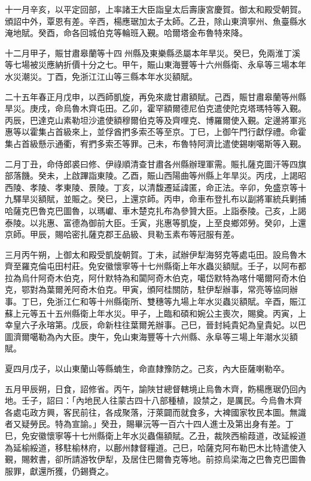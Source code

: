 \begin{pinyinscope}
十一月辛亥，以平定回部，上率諸王大臣詣皇太后壽康宮慶賀。御太和殿受朝賀。頒詔中外，覃恩有差。辛西，楊應琚加太子太師。乙丑，除山東濟寧州、魚臺縣水淹地賦。癸酉，命各回城伯克等輪班入覲。哈爾塔金布魯特來降。

十二月甲子，賑甘肅皋蘭等十四州縣及東樂縣丞屬本年旱災。癸巳，免兩淮丁溪等七場被災應納折價十分之七。甲午，賑山東海豐等十六州縣衛、永阜等三場本年水災潮災。丁酉，免浙江江山等三縣本年水災額賦。

二十五年春正月戊申，以西師凱旋，再免來歲甘肅額賦。己酉，賑甘肅皋蘭等州縣旱災。庚戌，命烏魯木齊屯田。乙卯，霍罕額爾德尼伯克遣使陀克塔瑪特等入覲。丙辰，巴達克山素勒坦沙遣使額穆爾伯克等及齊哩克、博羅爾使入覲。定邊將軍兆惠等以霍集占首級來上，並俘酋捫多索丕等至京。丁巳，上御午門行獻俘禮。命霍集占首級懸示通衢，宥捫多索丕等罪。己未，布魯特阿濟比遣使錫喇噶斯等入覲。

二月丁丑，命侍郎裘曰修、伊祿順清查甘肅各州縣辦理軍需。賑扎薩克圖汗等四旗部落饑。癸未，上啟蹕詣東陵。乙酉，賑山西陽曲等州縣上年旱災。丙戌，上謁昭西陵、孝陵、孝東陵、景陵。丁亥，以清馥遷延諱匿，命正法。辛卯，免盛京等十九驛旱災額賦，並賑之。癸巳，上還京師。丙申，命車布登扎布以副將軍統兵剿捕哈薩克巴魯克巴圖魯，以瑪巘、車木楚克扎布為參贊大臣。上詣泰陵。己亥，上謁泰陵。以兆惠、富德為御前大臣。壬寅，兆惠等凱旋，上至良鄉郊勞。癸卯，上還京師。甲辰，賜哈密扎薩克郡王品級、貝勒玉素布等冠服有差。

三月丙午朔，上御太和殿受凱旋朝賀。丁未，試辦伊犁海努克等處屯田。設烏魯木齊至羅克倫屯田村莊。免安徽懷寧等十七州縣衛上年水蟲災額賦。壬子，以阿布都拉為烏什阿奇木伯克，阿什默特為和闐阿奇木伯克，噶岱默特為喀什噶爾阿奇木伯克，鄂對為葉爾羌阿奇木伯克。甲寅，頒阿桂關防，駐伊犁辦事，常亮等協同辦事。丁巳，免浙江仁和等十州縣衛所、雙穗等九場上年水災蟲災額賦。辛酉，賑江蘇上元等五十五州縣衛上年水災。甲子，上臨和碩和婉公主喪次，賜奠。丙寅，上幸皇六子永瑢第。戊辰，命新柱往葉爾羌辦事。己巳，晉封純貴妃為皇貴妃。以巴圖濟爾噶勒為內大臣。庚午，免山東海豐等十六州縣、永阜等三場上年潮水災額賦。

夏四月戊子，以山東蘭山等縣蝻生，命直隸豫防之。己亥，內大臣薩喇勒卒。

五月甲辰朔，日食，詔修省。丙午，諭陜甘總督轄境止烏魯木齊，飭楊應琚仍回內地。壬子，詔曰：「內地民人往蒙古四十八部種植，設禁之，是厲民。今烏魯木齊各處屯政方興，客民前往，各成聚落，汙萊闢而就食多，大裨國家牧民本圖。無識者又疑勞民。特為宣諭。」癸丑，賜畢沅等一百六十四人進士及第出身有差。丁巳，免安徽懷寧等十七州縣衛上年水災蟲傷額賦。乙丑，裁陜西榆葭道，改延綏道為延榆綏道，移駐榆林府，以鄜州隸督糧道。己巳，哈薩克阿布勒巴木比特遣使入覲，賜敕書，卻所請游牧伊犁，及居住巴爾魯克等地。前掠烏梁海之巴魯克巴圖魯服罪，獻還所獲，仍錫賚之。


\end{pinyinscope}
